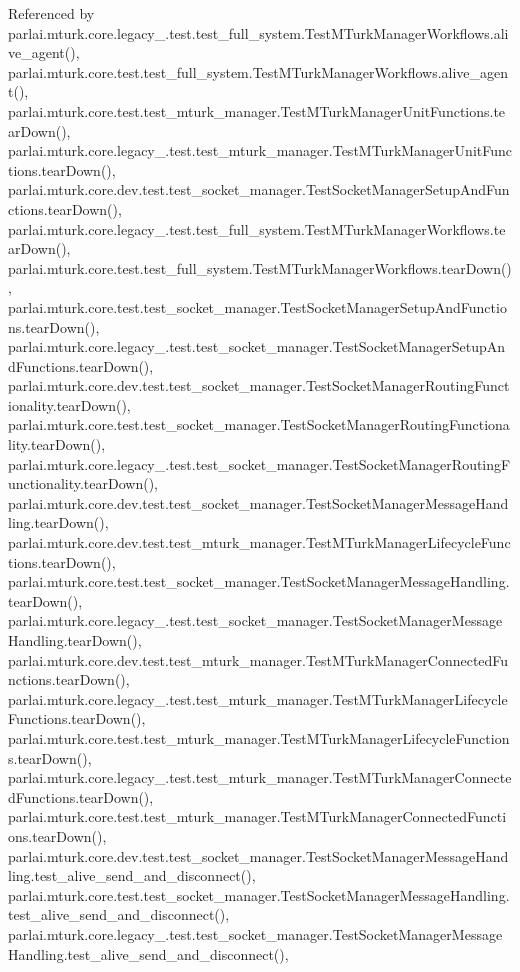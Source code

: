Referenced by parlai.\+mturk.\+core.\+legacy\+\_.\+test.\+test\+\_\+full\+\_\+system.\+Test\+M\+Turk\+Manager\+Workflows.\+alive\+\_\+agent(), parlai.\+mturk.\+core.\+test.\+test\+\_\+full\+\_\+system.\+Test\+M\+Turk\+Manager\+Workflows.\+alive\+\_\+agent(), parlai.\+mturk.\+core.\+test.\+test\+\_\+mturk\+\_\+manager.\+Test\+M\+Turk\+Manager\+Unit\+Functions.\+tear\+Down(), parlai.\+mturk.\+core.\+legacy\+\_.\+test.\+test\+\_\+mturk\+\_\+manager.\+Test\+M\+Turk\+Manager\+Unit\+Functions.\+tear\+Down(), parlai.\+mturk.\+core.\+dev.\+test.\+test\+\_\+socket\+\_\+manager.\+Test\+Socket\+Manager\+Setup\+And\+Functions.\+tear\+Down(), parlai.\+mturk.\+core.\+legacy\+\_.\+test.\+test\+\_\+full\+\_\+system.\+Test\+M\+Turk\+Manager\+Workflows.\+tear\+Down(), parlai.\+mturk.\+core.\+test.\+test\+\_\+full\+\_\+system.\+Test\+M\+Turk\+Manager\+Workflows.\+tear\+Down(), parlai.\+mturk.\+core.\+test.\+test\+\_\+socket\+\_\+manager.\+Test\+Socket\+Manager\+Setup\+And\+Functions.\+tear\+Down(), parlai.\+mturk.\+core.\+legacy\+\_.\+test.\+test\+\_\+socket\+\_\+manager.\+Test\+Socket\+Manager\+Setup\+And\+Functions.\+tear\+Down(), parlai.\+mturk.\+core.\+dev.\+test.\+test\+\_\+socket\+\_\+manager.\+Test\+Socket\+Manager\+Routing\+Functionality.\+tear\+Down(), parlai.\+mturk.\+core.\+test.\+test\+\_\+socket\+\_\+manager.\+Test\+Socket\+Manager\+Routing\+Functionality.\+tear\+Down(), parlai.\+mturk.\+core.\+legacy\+\_.\+test.\+test\+\_\+socket\+\_\+manager.\+Test\+Socket\+Manager\+Routing\+Functionality.\+tear\+Down(), parlai.\+mturk.\+core.\+dev.\+test.\+test\+\_\+socket\+\_\+manager.\+Test\+Socket\+Manager\+Message\+Handling.\+tear\+Down(), parlai.\+mturk.\+core.\+dev.\+test.\+test\+\_\+mturk\+\_\+manager.\+Test\+M\+Turk\+Manager\+Lifecycle\+Functions.\+tear\+Down(), parlai.\+mturk.\+core.\+test.\+test\+\_\+socket\+\_\+manager.\+Test\+Socket\+Manager\+Message\+Handling.\+tear\+Down(), parlai.\+mturk.\+core.\+legacy\+\_.\+test.\+test\+\_\+socket\+\_\+manager.\+Test\+Socket\+Manager\+Message\+Handling.\+tear\+Down(), parlai.\+mturk.\+core.\+dev.\+test.\+test\+\_\+mturk\+\_\+manager.\+Test\+M\+Turk\+Manager\+Connected\+Functions.\+tear\+Down(), parlai.\+mturk.\+core.\+legacy\+\_.\+test.\+test\+\_\+mturk\+\_\+manager.\+Test\+M\+Turk\+Manager\+Lifecycle\+Functions.\+tear\+Down(), parlai.\+mturk.\+core.\+test.\+test\+\_\+mturk\+\_\+manager.\+Test\+M\+Turk\+Manager\+Lifecycle\+Functions.\+tear\+Down(), parlai.\+mturk.\+core.\+legacy\+\_.\+test.\+test\+\_\+mturk\+\_\+manager.\+Test\+M\+Turk\+Manager\+Connected\+Functions.\+tear\+Down(), parlai.\+mturk.\+core.\+test.\+test\+\_\+mturk\+\_\+manager.\+Test\+M\+Turk\+Manager\+Connected\+Functions.\+tear\+Down(), parlai.\+mturk.\+core.\+dev.\+test.\+test\+\_\+socket\+\_\+manager.\+Test\+Socket\+Manager\+Message\+Handling.\+test\+\_\+alive\+\_\+send\+\_\+and\+\_\+disconnect(), parlai.\+mturk.\+core.\+test.\+test\+\_\+socket\+\_\+manager.\+Test\+Socket\+Manager\+Message\+Handling.\+test\+\_\+alive\+\_\+send\+\_\+and\+\_\+disconnect(), parlai.\+mturk.\+core.\+legacy\+\_.\+test.\+test\+\_\+socket\+\_\+manager.\+Test\+Socket\+Manager\+Message\+Handling.\+test\+\_\+alive\+\_\+send\+\_\+and\+\_\+disconnect(), 